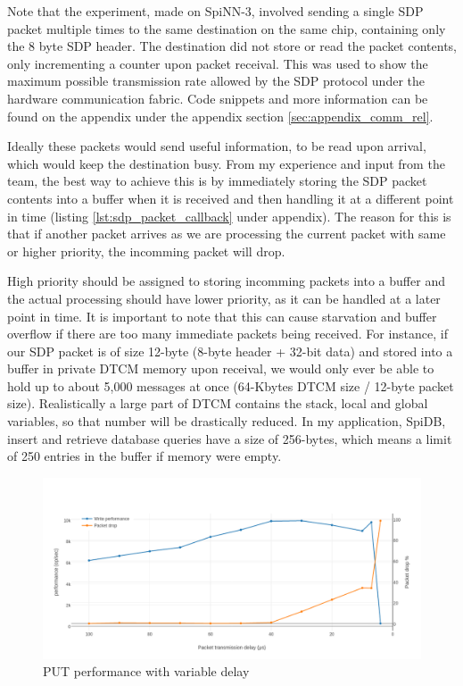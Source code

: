 Note that the experiment, made on SpiNN-3, involved sending a single SDP packet multiple times to the same destination on the same chip, containing only the 8 byte SDP header. The destination did not store or read the packet contents, only incrementing a counter upon packet receival. This was used to show the maximum possible transmission rate allowed by the SDP protocol under the hardware communication fabric. Code snippets and more information can be found on the appendix under the appendix section \ref{sec:appendix_comm_rel}.

Ideally these packets would send useful information, to be read upon arrival, which would keep the destination busy. From my experience and input from the team, the best way to achieve this is by immediately storing the SDP packet contents into a buffer when it is received and then handling it at a different point in time (listing \ref{lst:sdp_packet_callback} under appendix). The reason for this is that if another packet arrives as we are processing the current packet with same or higher priority, the incomming packet will drop.

High priority should be assigned to storing incomming packets into a buffer and the actual processing should have lower priority, as it can be handled at a later point in time. It is important to note that this can cause starvation and buffer overflow if there are too many immediate packets being received. For instance, if our SDP packet is of size 12-byte (8-byte header + 32-bit data) and stored into a buffer in private DTCM memory upon receival, we would only ever be able to hold up to about 5,000 messages at once (64-Kbytes DTCM size / 12-byte packet size). Realistically a large part of DTCM contains the stack, local and global variables, so that number will be drastically reduced. In my application, SpiDB, insert and retrieve database queries have a size of 256-bytes, which means a limit of 250 entries in the buffer if memory were empty.

\begin{figure}
\begin{center}
	\includegraphics[width=1.3\textwidth, natwidth=1063, natheight=509]{images/transmission_delay.png}
\end{center}
\caption{PUT performance with variable delay}
\label{fig:transmission-delay}
\end{figure}

